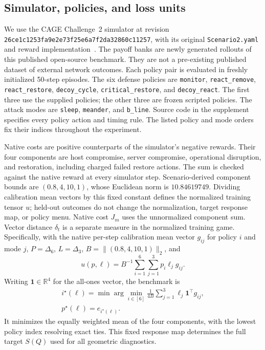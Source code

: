 \providecommand{\AAMASExperimentFigureDir}{figures}



\subsection{Simulator, policies, and loss units}
We use the CAGE Challenge~2 simulator at revision
\texttt{26ce1c1253fa9e2e73f25e6a7f2da32860c11257}, with its original
\texttt{Scenario2.yaml} and reward implementation~\cite{kiely2023autonomous,cagechallenge2}.
The payoff banks are newly generated rollouts of this published open-source
benchmark. They are not a pre-existing published dataset of external network
outcomes. Each policy pair is evaluated in freshly initialized 50-step episodes.
The six defense policies are \texttt{monitor}, \texttt{react\_remove},
\texttt{react\_restore}, \texttt{decoy\_cycle}, \texttt{critical\_restore},
and \texttt{decoy\_react}. The first three use the supplied policies;
the other three are frozen scripted policies. The attack modes are
\texttt{sleep}, \texttt{meander}, and \texttt{b\_line}. Source code in the
supplement specifies every policy action and timing rule.
The listed policy and mode orders fix their indices throughout the experiment.

Native costs are positive counterparts of the simulator's negative rewards.
Their four components are host compromise, server compromise, operational
disruption, and restoration, including charged failed restore actions.
The sum is checked against the native reward at every simulator step.
Scenario-derived component bounds are $(0.8,4,10,1)$, whose Euclidean norm is
$10.84619749$. Dividing calibration mean vectors by this fixed constant
defines the normalized training tensor $u$; held-out outcomes do not change
the normalization, target response map, or policy menu. Native cost $J_m$
uses the unnormalized component sum. Vector distance $\delta_t$ is a separate
measure in the normalized training game.
Specifically, with the native per-step calibration mean vector $g_{ij}$ for policy $i$ and
mode $j$, $P=\Delta_6$, $L=\Delta_3$, $B=\|(0.8,4,10,1)\|_2$, and
\[
 u(p,\ell)=B^{-1}\sum_{i=1}^6\sum_{j=1}^3p_i\ell_jg_{ij}.
\]
Writing $\mathbf 1\in\mathbb R^4$ for the all-ones vector, the benchmark is
\[
 \begin{aligned}
 i^\star(\ell)=\min\arg\min_{i\in[6]}
 \frac{1}{4B}\sum_{j=1}^3\ell_j\mathbf 1^\top g_{ij},\\
 p^\star(\ell)=e_{i^\star(\ell)}.
 \end{aligned}
\]
It minimizes the equally weighted mean of the four components, with the
lowest policy index resolving exact ties. This fixed response map determines
the full target $S(Q)$ used for all geometric diagnostics.


